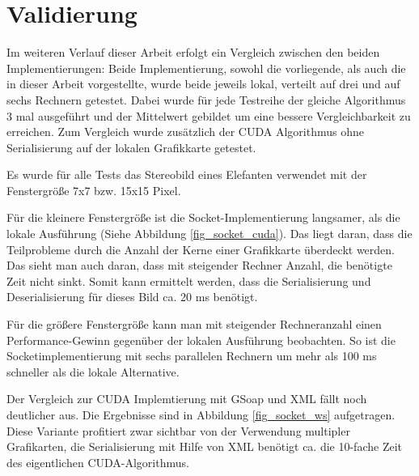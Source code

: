 \documentclass[conference]{IEEEtran}
\begin{document}
\section{Validierung}
Im weiteren Verlauf dieser Arbeit erfolgt ein Vergleich zwischen den beiden Implementierungen: 
Beide Implementierung, sowohl die vorliegende, als auch die in dieser Arbeit vorgestellte, wurde beide jeweils lokal, verteilt auf drei und auf sechs Rechnern getestet. Dabei wurde für jede Testreihe der gleiche Algorithmus 3 mal ausgeführt und der Mittelwert gebildet um eine bessere Vergleichbarkeit zu erreichen. Zum Vergleich wurde zusätzlich der CUDA Algorithmus ohne Serialisierung auf der lokalen Grafikkarte getestet. 

Es wurde für alle Tests das Stereobild eines Elefanten verwendet mit der Fenstergröße 7x7 bzw. 15x15 Pixel.

Für die kleinere Fenstergröße ist die Socket-Implementierung langsamer, als die lokale Ausführung (Siehe Abbildung \ref{fig_socket_cuda}). Das liegt daran, dass die Teilprobleme durch die Anzahl der Kerne einer Grafikkarte überdeckt werden. Das sieht man auch daran, dass mit steigender Rechner Anzahl, die benötigte Zeit nicht sinkt. Somit kann ermittelt werden, dass die Serialisierung und Deserialisierung für dieses Bild ca. 20 ms benötigt.

Für die größere Fenstergröße kann man mit steigender Rechneranzahl einen Performance-Gewinn gegenüber der lokalen Ausführung beobachten. So ist die Socketimplementierung mit sechs parallelen Rechnern um mehr als 100 ms schneller als die lokale Alternative.

Der Vergleich zur CUDA Implemtierung mit GSoap und XML fällt noch deutlicher aus. Die Ergebnisse sind in Abbildung \ref{fig_socket_ws} aufgetragen. Diese Variante profitiert zwar sichtbar von der Verwendung multipler Grafikarten, die Serialisierung mit Hilfe von XML benötigt ca. die 10-fache Zeit des eigentlichen CUDA-Algorithmus. 




%
%
\end{document}
